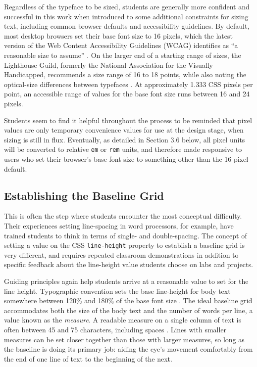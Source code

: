 \documentclass[sigplan,screen]{acmart}
\begin{document}
Regardless of the typeface to be sized, students are generally more confident and successful in this work when introduced to some additional constraints for sizing text, including common browser defaults and accessibility guidelines. By default, most desktop browsers set their base font size to 16 pixels, which the latest version of the Web Content Accessibility Guidelines (WCAG) identifies as “a reasonable size to assume” \cite{w3c:wcag}. On the larger end of a starting range of sizes, the Lighthouse Guild, formerly the National Association for the Visually Handicapped, recommends a size range of 16 to 18 points, while also noting the optical-size differences between typefaces \cite{lhg:mtl}. At approximately 1.333 CSS pixels per point, an accessible range of values for the base font size runs between 16 and 24 pixels.

Students seem to find it helpful throughout the process to be reminded that pixel values are only temporary convenience values for use at the design stage, when sizing is still in flux. Eventually, as detailed in Section 3.6 below, all pixel units will be converted to relative \verb|em| or \verb|rem| units, and therefore made responsive to users who set their browser's base font size to something other than the 16-pixel default.

\subsection{Establishing the Baseline Grid}

This is often the step where students encounter the most conceptual difficulty. Their experiences setting line-spacing in word processors, for example, have trained students to think in terms of single- and double-spacing. The concept of setting a value on the CSS \verb|line-height| property to establish a baseline grid is very different, and requires repeated classroom demonstrations in addition to specific feedback about the line-height value students choose on labs and projects.

Guiding principles again help students arrive at a reasonable value to set for the line height. Typographic convention sets the base line-height for body text somewhere between 120\% and 180\% of the base font size  \cite[p.~92]{jsm:owt}. The ideal baseline grid accommodates both the size of the body text and the number of words per line, a value known as the {\itshape measure}. A readable measure on a single column of text is often between 45 and 75 characters, including spaces \cite[pp. 26–27]{rb:style}. Lines with smaller measures can be set closer together than those with larger measures, so long as the baseline is doing its primary job: aiding the eye's movement comfortably from the end of one line of text to the beginning of the next.
\end{document}
